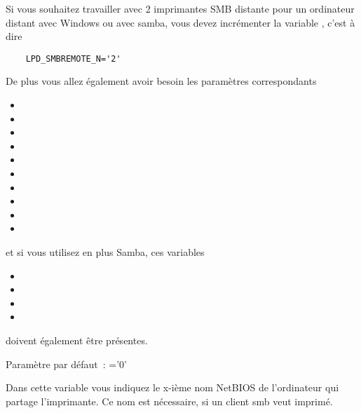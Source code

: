 \begin{description}
    Si vous souhaitez travailler avec 2 imprimantes SMB distante pour un ordinateur
    distant avec Windows ou avec samba, vous devez incrémenter la variable
    , c'est à dire

\begin{example}
\begin{verbatim}
    LPD_SMBREMOTE_N='2'
\end{verbatim}
\end{example}

    De plus vous allez également avoir besoin les paramètres correspondants

\begin{itemize}
\item {}
\item {}
\item {}
\item {}
\item {}
\item {}
\item {}
\item {}
\item {}
\item {}
\end{itemize}

    et si vous utilisez en plus Samba, ces variables

\begin{itemize}
\item {}
\item {}
\item {}
\item {}
\end{itemize}

    doivent également être présentes.

    Paramètre par défaut~: ='0'



    Dans cette variable  vous indiquez le
    x-ième nom NetBIOS de l'ordinateur qui partage l'imprimante. Ce nom est
    nécessaire, si un client smb veut imprimé.


\end{description}
